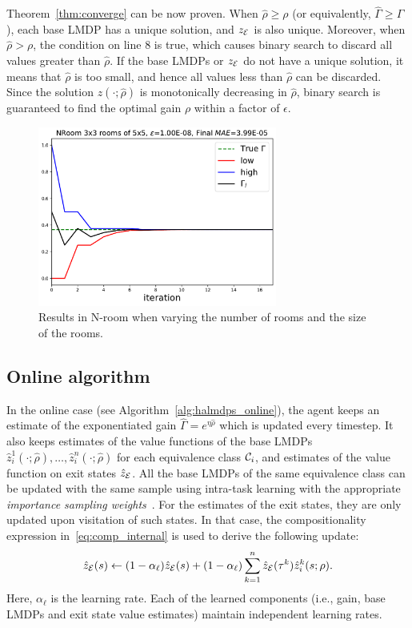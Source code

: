 Theorem~\ref{thm:converge} can be now proven. When $\hat\rho\geq\rho$ (or equivalently, $\widehat\Gamma\geq\Gamma$), each base LMDP has a unique solution, and $z_{\mathcal{E}}$ is also unique. Moreover, when $\hat\rho>\rho$, the condition on line 8 is true, which causes binary search to discard all values greater than $\hat\rho$. If the base LMDPs or $z_{\mathcal{E}}$ do not have a unique solution, it means that $\hat\rho$ is too small, and hence all values less than $\hat\rho$ can be discarded. Since the solution $z(\cdot;\hat\rho)$ is monotonically decreasing in $\hat\rho$, binary search is guaranteed to find the optimal gain $\rho$ within a factor of $\epsilon$.

\begin{figure}[!ht]
  \centering
  \includegraphics*[width=0.7\textwidth]{figures/chapter2/eigenvectors/lmdp-nroom-1.pdf}
  \caption{Results in N-room when varying the number of rooms and the size of the rooms.}
  \label{fig:nrooms}
 \end{figure}

\subsection{Online algorithm}
 In the online case (see Algorithm~\ref{alg:halmdps_online}), the agent keeps an estimate of the exponentiated gain $\widehat\Gamma=e^{\eta\hat\rho}$ which is updated every timestep. It also keeps estimates of the value functions of the base LMDPs $\hat z_i^1(\cdot;\hat\rho),\ldots,\hat z_i^n(\cdot;\hat\rho)$ for each equivalence class $\mathcal{C}_i$, and estimates of the value function on exit states $\hat z_{\mathcal{E}}$.  All the base LMDPs of the same equivalence class can be updated with the same sample using intra-task learning with the appropriate {\it importance sampling weights\/}~\citep{Jonsson2016}. For the estimates of the exit states, they are only updated upon visitation of such states. In that case, the compositionality expression in~\eqref{eq:comp_internal} is used to derive the following update:
\begin{equation}
  \hat z_{\mathcal{E}}(s)\gets (1-\alpha_\ell) \hat z_{\mathcal{E}}(s) + (1-\alpha_\ell) \sum_{k=1}^n \hat z_{\mathcal{E}}(\tau^k) \hat z_i^k(s;\rho).
  \label{eq:td_update_exit}
\end{equation}
Here, $\alpha_\ell$ is the learning rate. Each of the learned components (i.e., gain, base LMDPs and exit state value estimates) maintain independent learning rates.

